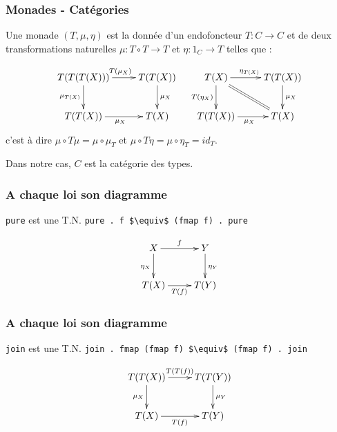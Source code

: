\documentclass{beamer}
\begin{document}
\begin{frame}
\frametitle{Monades - Catégories}
Une monade $(T, \mu, \eta)$ est la donnée d'un
endofoncteur $T : C \rightarrow C$ et de deux
transformations naturelles $\mu : T\circ T \rightarrow T$ et $\eta : 1_C \rightarrow T$ telles que :

\[
\begin{array}{cc}
\xymatrix{
T(T(T(X))) \ar[r]^{T(\mu_X)} \ar[d]_{\mu_{T(X)}} & T(T(X)) \ar[d]^{\mu_X} \\
T(T(X)) \ar[r]_{\mu_X} & T(X) \\
}
&
\xymatrix{
T(X) \ar[r]^{\eta_{T(X)}} \ar[d]_{T(\eta_X)}  \ar@{=}[dr] & T(T(X)) \ar[d]^{\mu_X} \\
T(T(X)) \ar[r]_{\mu_X} & T(X) \\
}
\end{array}
\]
c'est à dire
$\mu \circ T\mu = \mu \circ \mu_T$
et
$\mu \circ T \eta = \mu \circ \eta_T = id_T$.

\pause

Dans notre cas, $C$ est la catégorie des types.
\end{frame}

\begin{frame}
\frametitle{A chaque loi son diagramme}
\begin{alertblock}{\verb!pure! est une T.N.}
\verb!pure . f $\equiv$ (fmap f) . pure!
\end{alertblock}

\begin{block}{}
\[
\xymatrix{
X \ar[r]^{f} \ar[d]_{\eta_X} & Y \ar[d]^{\eta_Y} \\
T(X) \ar[r]_{T(f)} & T(Y) \\
}
\]
\end{block}

\end{frame}

\begin{frame}
\frametitle{A chaque loi son diagramme}
\begin{alertblock}{\verb!join! est une T.N.}
\verb!join . fmap (fmap f) $\equiv$ (fmap f) . join!
\end{alertblock}

\begin{block}{}
\[
\xymatrix{
T(T(X)) \ar[r]^{T(T(f))} \ar[d]_{\mu_{X}} & T(T(Y)) \ar[d]^{\mu_{Y}} \\
T(X) \ar[r]_{T(f)} & T(Y) \\
}
\]
\end{block}

\end{frame}
\end{document}

